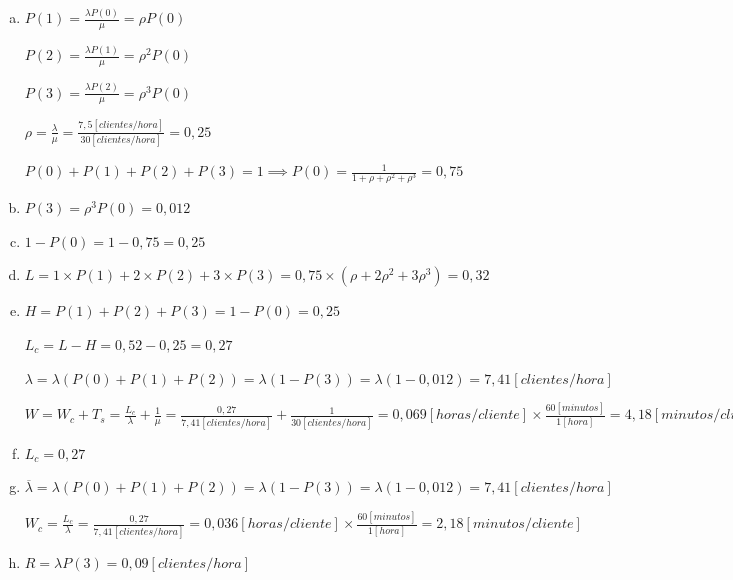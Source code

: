 \documentclass[a4paper,11pt]{article}
\begin{document}
\vspace{13pt}
\leftskip=36pt
\parindent=-18pt
\begin{enumerate}[a)]
  \item 
    $P(1) = \frac{\lambda P(0)}{\mu} = \rho P(0)$ 

    $P(2) = \frac{\lambda P(1)}{\mu} = \rho^2P(0)$ 

    $P(3) = \frac{\lambda P(2)}{\mu} = \rho^3P(0)$ 

    $\rho = \frac{\lambda}{\mu} = \frac{7,5[clientes/hora]}{30[clientes/hora]}
    = 0,25$

    $P(0) + P(1) + P(2) +P(3) = 1 \implies P(0) =
    \frac{1}{1+\rho+\rho^2+\rho^3} = 0,75$
   

  \vspace{13pt}
  \item
    $P(3) = \rho^3P(0) = 0,012$ 

  \vspace{13pt}
  \item
    $1-P(0) = 1-0,75 = 0,25$ 

  \vspace{13pt}
  \item
    $L = 1 \times P(1) + 2 \times P(2) + 3 \times P(3) = 0,75
    \times(\rho+2\rho^2+3\rho^3) = 0,32$ 

  \vspace{13pt}
  \item
    $H = P(1) + P(2) + P(3) = 1 - P(0) = 0,25$ 

    $L_c = L - H = 0,52 - 0,25 = 0,27$ 

    $\lambda = \lambda(P(0) + P(1) + P(2)) = \lambda(1-P(3)) = \lambda(1-0,012)
    = 7,41 [clientes/hora]$ 

    $W = W_c + T_s = \frac{L_c}{\lambda} + \frac{1}{\mu} =
    \frac{0,27}{7,41[clientes/hora]} + \frac{1}{30[clientes/hora]} =
    0,069[horas/cliente] \times \frac{60[minutos]}{1[hora]} =
    4,18[minutos/cliente]$

  \vspace{13pt}
  \item
    $L_c = 0,27$

  \vspace{13pt}
  \item
    $\overline{\lambda} = \lambda(P(0) + P(1) + P(2)) = \lambda(1-P(3)) =
    \lambda(1-0,012) = 7,41[clientes/hora]$

    $W_c = \frac{L_c}{\lambda} = \frac{0,27}{7,41[clientes/hora]} =
    0,036[horas/cliente] \times \frac{60[minutos]}{1[hora]} =
    2,18[minutos/cliente]$

  \vspace{13pt}
  \item
    $R = \lambda P(3) = 0,09[clientes/hora]$
\end{enumerate}
\end{document}
